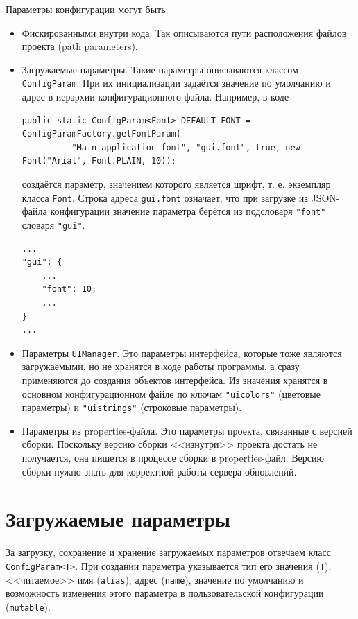 \documentclass[fontsize=10px, a4paper, openany]{scrbook}
\begin{document}
Параметры конфигурации могут быть:
\begin{itemize}
\item Фискированными внутри кода. Так описываются пути расположения файлов проекта (path parameters).
\item Загружаемые параметры. Такие параметры описываются классом \texttt{ConfigParam}. При их инициализации задаётся значение по умолчанию и адрес в иерархии конфигурационного файла. Например, в коде

\begin{lstlisting}
public static ConfigParam<Font> DEFAULT_FONT = ConfigParamFactory.getFontParam(
          "Main_application_font", "gui.font", true, new Font("Arial", Font.PLAIN, 10));
\end{lstlisting}

создаётся параметр, значением которого является шрифт, т. е. экземпляр класса \texttt{Font}. Строка адреса \texttt{gui.font} означает, что при загрузке из JSON-файла конфигурации значение параметра берётся из подсловаря \texttt{"font"} словаря \texttt{"gui"}.

\begin{lstlisting}
...
"gui": {
	...
	"font": 10;
	...
}
...
\end{lstlisting}

\item Параметры \texttt{UIManager}. Это параметры интерфейса, которые тоже являются загружаемыми, но не хранятся в ходе работы программы, а сразу применяются до создания объектов интерфейса. Из значения хранятся в основном конфигурационном файле по ключам \texttt{"uicolors"} (цветовые параметры) и \texttt{"uistrings"} (строковые параметры).

\item Параметры из properties-файла. Это параметры проекта, связанные с версией сборки. Поскольку версию сборки <<изнутри>> проекта достать не получается, она пишется в процессе сборки в properties-файл. Версию сборки нужно знать для корректной работы сервера обновлений.
\end{itemize}

\section{Загружаемые параметры}

За загрузку, сохранение и хранение загружаемых параметров отвечаем класс \texttt{ConfigParam<T>}. При создании параметра указывается тип его значения (\texttt{T}), <<читаемое>> имя (\texttt{alias}), адрес (\texttt{name}), значение по умолчанию и возможность изменения этого параметра в пользовательской конфигурации (\texttt{mutable}).
\end{document}
